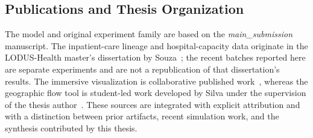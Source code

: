 \documentclass[pdflatex,sn-mathphys-num]{sn-jnl}%
\newcommand\red[1]{#1}
\theoremstyle{thmstyleone}%
\theoremstyle{thmstyletwo}%
\theoremstyle{thmstylethree}%
\begin{document}

\subsection{Publications and Thesis Organization}

The model and original experiment family are based on the \textit{main\_submission} manuscript. The inpatient-care lineage and hospital-capacity data originate in the LODUS-Health master's dissertation by Souza~\citep{souza2026lodushealth}; the recent batches reported here are separate experiments and are not a republication of that dissertation's results. The immersive visualization is collaborative published work~\citep{teixeira2024visualization}, whereas the geographic flow tool is student-led work developed by Silva under the supervision of the thesis author~\citep{silva2026geospatial}. These sources are integrated with explicit attribution and with a distinction between prior artifacts, recent simulation work, and the synthesis contributed by this thesis.
\end{document}
